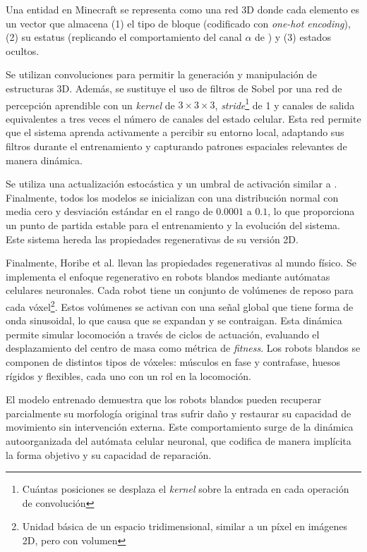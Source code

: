 Una entidad en Minecraft se representa como una red 3D donde cada elemento es un vector que almacena (1) el tipo de bloque (codificado con \textit{one-hot encoding}), (2) su estatus (replicando el comportamiento del canal $\alpha$ de \cite{mordvintsev2020_nca}) y (3) estados ocultos.

Se utilizan convoluciones para permitir la generación y manipulación de estructuras 3D. Además, se sustituye el uso de filtros de Sobel por una red de percepción aprendible con un \textit{kernel} de $3 \times 3 \times 3$, \textit{stride}\footnote{Cuántas posiciones se desplaza el \textit{kernel} sobre la entrada en cada operación de convolución} de 1 y canales de salida equivalentes a tres veces el número de canales del estado celular. Esta red permite que el sistema aprenda activamente a percibir su entorno local, adaptando sus filtros durante el entrenamiento y capturando patrones espaciales relevantes de manera dinámica.

Se utiliza una actualización estocástica y un umbral de activación similar a \cite{mordvintsev2020_nca}. Finalmente, todos los modelos se inicializan con una distribución normal con media cero y desviación estándar en el rango de $0.0001$ a $0.1$, lo que proporciona un punto de partida estable para el entrenamiento y la evolución del sistema. Este sistema hereda las propiedades regenerativas de su versión 2D.

Finalmente, Horibe et al. \cite{horibe2021_softrobot} llevan las propiedades regenerativas al mundo físico. Se implementa el enfoque regenerativo en robots blandos mediante autómatas celulares neuronales. Cada robot tiene un conjunto de volúmenes de reposo para cada vóxel\footnote{Unidad básica de un espacio tridimensional, similar a un píxel en imágenes 2D, pero con volumen}. Estos volúmenes se activan con una señal global que tiene forma de onda sinusoidal, lo que causa que se expandan y se contraigan. Esta dinámica permite simular locomoción a través de ciclos de actuación, evaluando el desplazamiento del centro de masa como métrica de \textit{fitness}. Los robots blandos se componen de distintos tipos de vóxeles: músculos en fase y contrafase, huesos rígidos y flexibles, cada uno con un rol en la locomoción.

El modelo entrenado demuestra que los robots blandos pueden recuperar parcialmente su morfología original tras sufrir daño y restaurar su capacidad de movimiento sin intervención externa. Este comportamiento surge de la dinámica autoorganizada del autómata celular neuronal, que codifica de manera implícita la forma objetivo y su capacidad de reparación.


